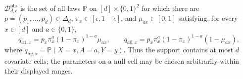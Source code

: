 \(\mathcal D_{d,\epsilon}^{\mathrm{obs}}\) is the set of all laws \(\mathbb P\) on \([d]\times\{0,1\}^2\) for which there are \(p=(p_1,\ldots,p_d)\in\Delta_d\), \(\pi_x\in[\epsilon,1-\epsilon]\), and \(\mu_{ax}\in[0,1]\) satisfying, for every \(x\in[d]\) and \(a\in\{0,1\}\),
\[
 q_{a1,x}=p_x\pi_x^a(1-\pi_x)^{1-a}\mu_{ax},\qquad
 q_{a0,x}=p_x\pi_x^a(1-\pi_x)^{1-a}(1-\mu_{ax}),
\]
where \(q_{ay,x}=\mathbb P(X=x,A=a,Y=y)\).  Thus the support contains at most \(d\) covariate cells; the parameters on a null cell may be chosen arbitrarily within their displayed ranges.